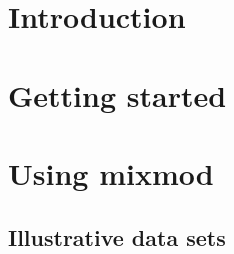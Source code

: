 \documentclass{book}
\begin{document}
\bigskip
\bigskip

\thispagestyle{empty}

\newpage

\tableofcontents

\chapter{Introduction}



\chapter{Getting started}



%

\chapter{Using {\sc mixmod}}



\section{Illustrative data sets}



%


%
\end{document}
